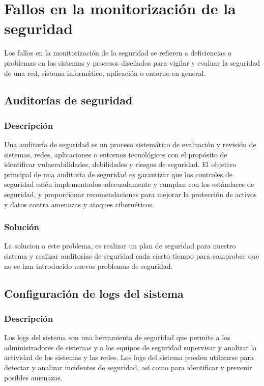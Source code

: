 \documentclass{report}
\begin{document}
        \section{Fallos en la monitorización de la seguridad}
            Los fallos en la monitorización de la seguridad se refieren a deficiencias o problemas en los sistemas y procesos diseñados para vigilar y evaluar la seguridad de una red, sistema informático, aplicación o entorno en general.
            \subsection{Auditorías de seguridad}
                \subsubsection{Descripción}
                    Una auditoría de seguridad es un proceso sistemático de evaluación y revisión de sistemas, redes, aplicaciones o entornos tecnológicos con el propósito de identificar vulnerabilidades, debilidades y riesgos de seguridad. El objetivo principal de una auditoría de seguridad es garantizar que los controles de seguridad estén implementados adecuadamente y cumplan con los estándares de seguridad, y proporcionar recomendaciones para mejorar la protección de activos y datos contra amenazas y ataques cibernéticos.
                \subsubsection{Solución}
                    La solucion a este problema, es realizar un plan de seguridad para nuestro sistema y realizar auditorías de seguridad cada cierto tiempo para comprobar que no se han introducido nuevos problemas de seguridad.
            \clearpage
            \subsection{Configuración de logs del sistema}
                \subsubsection{Descripción}
                    Los logs del sistema son una herramienta de seguridad que permite a los administradores de sistemas y a los equipos de seguridad supervisar y analizar la actividad de los sistemas y las redes. Los logs del sistema pueden utilizarse para detectar y analizar incidentes de seguridad, así como para identificar y prevenir posibles amenazas.
\end{document}

